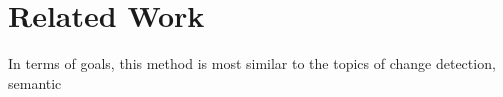 \section{Related Work}
\label{sec:related_work}

In terms of goals, this method is most similar to the topics of change detection, semantic 

% 